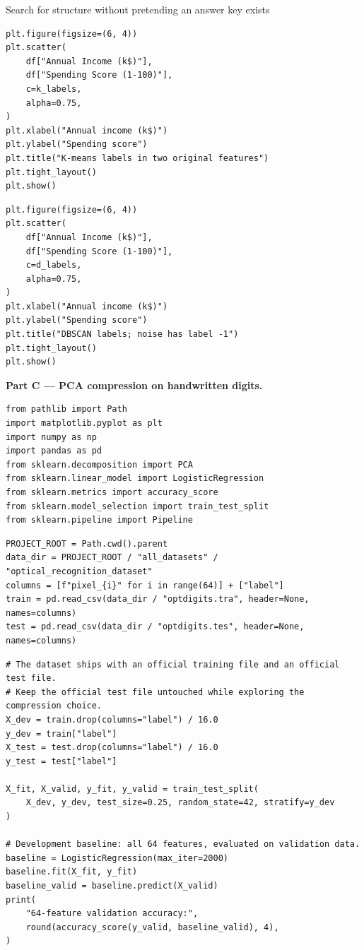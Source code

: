 \begin{labproject}{Search for structure without pretending an answer key exists}
\begin{lstlisting}[style=mlpython]
plt.figure(figsize=(6, 4))
plt.scatter(
    df["Annual Income (k$)"],
    df["Spending Score (1-100)"],
    c=k_labels,
    alpha=0.75,
)
plt.xlabel("Annual income (k$)")
plt.ylabel("Spending score")
plt.title("K-means labels in two original features")
plt.tight_layout()
plt.show()
\end{lstlisting}

\begin{lstlisting}[style=mlpython]
plt.figure(figsize=(6, 4))
plt.scatter(
    df["Annual Income (k$)"],
    df["Spending Score (1-100)"],
    c=d_labels,
    alpha=0.75,
)
plt.xlabel("Annual income (k$)")
plt.ylabel("Spending score")
plt.title("DBSCAN labels; noise has label -1")
plt.tight_layout()
plt.show()
\end{lstlisting}

\medskip\noindent\textbf{Part C --- PCA compression on handwritten digits.}\par
\begin{lstlisting}[style=mlpython]
from pathlib import Path
import matplotlib.pyplot as plt
import numpy as np
import pandas as pd
from sklearn.decomposition import PCA
from sklearn.linear_model import LogisticRegression
from sklearn.metrics import accuracy_score
from sklearn.model_selection import train_test_split
from sklearn.pipeline import Pipeline
\end{lstlisting}

\begin{lstlisting}[style=mlpython]
PROJECT_ROOT = Path.cwd().parent
data_dir = PROJECT_ROOT / "all_datasets" / "optical_recognition_dataset"
columns = [f"pixel_{i}" for i in range(64)] + ["label"]
train = pd.read_csv(data_dir / "optdigits.tra", header=None, names=columns)
test = pd.read_csv(data_dir / "optdigits.tes", header=None, names=columns)
\end{lstlisting}

\begin{lstlisting}[style=mlpython]
# The dataset ships with an official training file and an official test file.
# Keep the official test file untouched while exploring the compression choice.
X_dev = train.drop(columns="label") / 16.0
y_dev = train["label"]
X_test = test.drop(columns="label") / 16.0
y_test = test["label"]

X_fit, X_valid, y_fit, y_valid = train_test_split(
    X_dev, y_dev, test_size=0.25, random_state=42, stratify=y_dev
)

# Development baseline: all 64 features, evaluated on validation data.
baseline = LogisticRegression(max_iter=2000)
baseline.fit(X_fit, y_fit)
baseline_valid = baseline.predict(X_valid)
print(
    "64-feature validation accuracy:",
    round(accuracy_score(y_valid, baseline_valid), 4),
)
\end{lstlisting}


\end{labproject}
